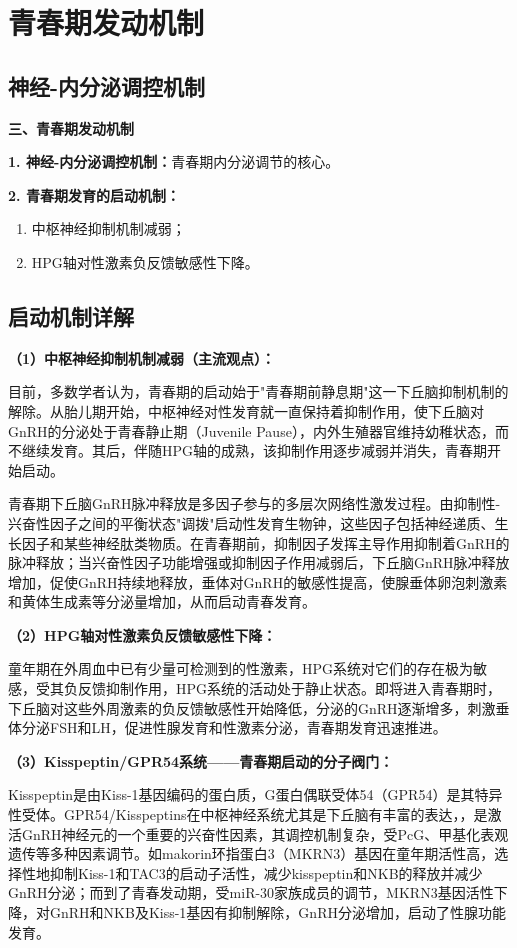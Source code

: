 \section{青春期发动机制}

\subsection{神经-内分泌调控机制}

\begin{keybox}
\textbf{三、青春期发动机制}

\textbf{1. 神经-内分泌调控机制：}青春期内分泌调节的核心。

\textbf{2. 青春期发育的启动机制：}
\begin{enumerate}[leftmargin=*]
    \item 中枢神经抑制机制减弱；
    \item HPG轴对性激素负反馈敏感性下降。
\end{enumerate}
\end{keybox}

\subsection{启动机制详解}

\begin{keybox}
\textbf{（1）中枢神经抑制机制减弱（主流观点）：}

目前，多数学者认为，青春期的启动始于"青春期前静息期"这一下丘脑抑制机制的解除。从胎儿期开始，中枢神经对性发育就一直保持着抑制作用，使下丘脑对GnRH的分泌处于青春静止期（Juvenile Pause），内外生殖器官维持幼稚状态，而不继续发育。其后，伴随HPG轴的成熟，该抑制作用逐步减弱并消失，青春期开始启动。

青春期下丘脑GnRH脉冲释放是多因子参与的多层次网络性激发过程。由抑制性-兴奋性因子之间的平衡状态"调拨"启动性发育生物钟，这些因子包括神经递质、生长因子和某些神经肽类物质。在青春期前，抑制因子发挥主导作用抑制着GnRH的脉冲释放；当兴奋性因子功能增强或抑制因子作用减弱后，下丘脑GnRH脉冲释放增加，促使GnRH持续地释放，垂体对GnRH的敏感性提高，使腺垂体卵泡刺激素和黄体生成素等分泌量增加，从而启动青春发育。

\textbf{（2）HPG轴对性激素负反馈敏感性下降：}

童年期在外周血中已有少量可检测到的性激素，HPG系统对它们的存在极为敏感，受其负反馈抑制作用，HPG系统的活动处于静止状态。即将进入青春期时，下丘脑对这些外周激素的负反馈敏感性开始降低，分泌的GnRH逐渐增多，刺激垂体分泌FSH和LH，促进性腺发育和性激素分泌，青春期发育迅速推进。

\textbf{（3）Kisspeptin/GPR54系统——青春期启动的分子阀门：}

Kisspeptin是由Kiss-1基因编码的蛋白质，G蛋白偶联受体54（GPR54）是其特异性受体。GPR54/Kisspeptins在中枢神经系统尤其是下丘脑有丰富的表达，，是激活GnRH神经元的一个重要的兴奋性因素，其调控机制复杂，受PcG、甲基化表观遗传等多种因素调节。如makorin环指蛋白3（MKRN3）基因在童年期活性高，选择性地抑制Kiss-1和TAC3的启动子活性，减少kisspeptin和NKB的释放并减少GnRH分泌；而到了青春发动期，受miR-30家族成员的调节，MKRN3基因活性下降，对GnRH和NKB及Kiss-1基因有抑制解除，GnRH分泌增加，启动了性腺功能发育。
\end{keybox}

